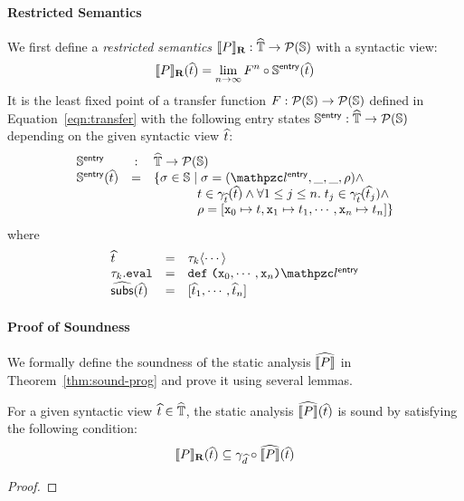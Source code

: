 \paragraph{Restricted Semantics} We first define a \textit{restricted semantics}
$\llbracket{P}\rrbracket_\textbf{R}: \widehat{\mathbb{T}} \rightarrow \mathcal{P}(\mathbb{S})$ with a syntactic view:
\[
  \llbracket{P}\rrbracket_\textbf{R}(\widehat{t}) = \lim_{n \rightarrow \infty}F^n \circ
  \mathbb{S}^{\textsf{entry}}(\widehat{t})
\]
It is the least fixed point of a transfer function $F: \mathcal{P}(\mathbb{S})
\rightarrow \mathcal{P}(\mathbb{S})$ defined in Equation~\ref{eqn:transfer} with the
following entry states $\mathbb{S}^{\textsf{entry}}: \widehat{\mathbb{T}} \rightarrow \mathcal{P}(\mathbb{S})$
depending on the given syntactic view $\widehat{t}$:
\[
  \begin{array}{lcl}
    \entrystset &:& \atreeset \rightarrow \powerset{\stset}\\

    \entrystset(\atree) &=& \{ \st \in \stset \mid
      \st = (\entrylab, \_, \_, \env) \wedge\\&&

      \phantom{\{ \st \in \stset \mid}
        \tree \in \atreegamma(\atree) \wedge \forall 1 \leq j \leq n. \;
      \tree_j \in \atreegamma(\atree_j) \wedge\\&&

      \phantom{\{ \st \in \stset \mid}
        \env = [\varx_0 \mapsto \tree, \varx_1 \mapsto \tree_1, \cdots,
        \varx_n \mapsto \tree_n]
      \}\\
    \end{array}
  \]
where
\[
  \begin{array}{lcl}
    \atree &=& \ty_k \langle \cdots \rangle\\
    \ty_k.\eval &=& \kwdef \; \kwrl \varx_0, \cdots, \varx_n \kwrr \entrylab\\
    \agetsubs(\atree) &=& [\atree_1, \cdots, \atree_n]\\
  \end{array}
\]


\paragraph{Proof of Soundness} We formally define the soundness of the static
analysis $\widehat{\llbracket{P}\rrbracket}$ in Theorem~\ref{thm:sound-prog} and prove it using
several lemmas.

\begin{theorem}\label{thm:sound-prog}
  For a given syntactic view $\widehat{t} \in \widehat{\mathbb{T}}$, the static analysis
  $\widehat{\llbracket{P}\rrbracket}(\widehat{t})$ is sound by satisfying the following condition:
  \[
    \llbracket{P}\rrbracket_\textbf{R}(\widehat{t}) \subseteq \gamma_{\widehat{d}} \circ \widehat{\llbracket{P}\rrbracket}(\widehat{t})
  \]
\end{theorem}
\begin{proof}
  \todo
\end{proof}

